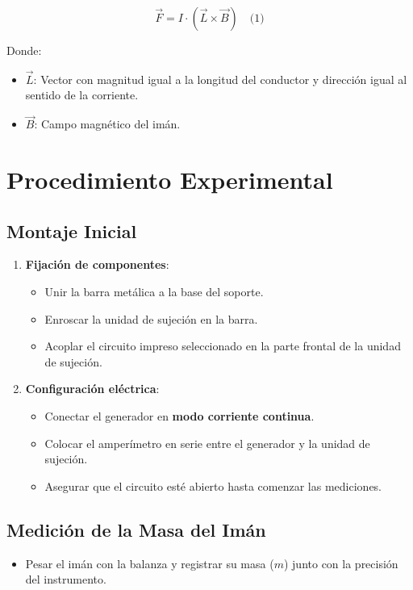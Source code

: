 \documentclass{article}
\begin{document}
\[
\vec{F} = I \cdot (\vec{L} \times \vec{B}) \quad \text{(1)}
\]

Donde:
\begin{itemize}
    \item \( \vec{L} \): Vector con magnitud igual a la longitud del conductor y dirección igual al sentido de la corriente.
    \item \( \vec{B} \): Campo magnético del imán.
\end{itemize}

\section{Procedimiento Experimental}
\subsection{Montaje Inicial}
\begin{enumerate}
    \item \textbf{Fijación de componentes}:
    \begin{itemize}
        \item Unir la barra metálica a la base del soporte.
        \item Enroscar la unidad de sujeción en la barra.
        \item Acoplar el circuito impreso seleccionado en la parte frontal de la unidad de sujeción.
    \end{itemize}
    
    \item \textbf{Configuración eléctrica}:
    \begin{itemize}
        \item Conectar el generador en \textbf{modo corriente continua}.
        \item Colocar el amperímetro en serie entre el generador y la unidad de sujeción.
        \item Asegurar que el circuito esté abierto hasta comenzar las mediciones.
    \end{itemize}
\end{enumerate}

\subsection{Medición de la Masa del Imán}
\begin{itemize}
    \item Pesar el imán con la balanza y registrar su masa (\( m \)) junto con la precisión del instrumento.
\end{itemize}
\end{document}
